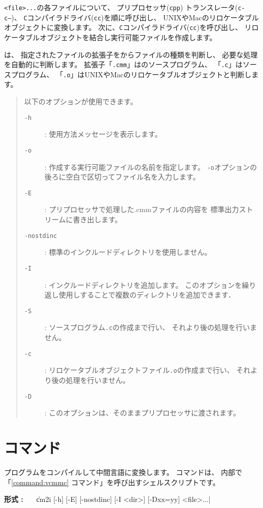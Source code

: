 {\tt <file>...}の各ファイルについて、
プリプロセッサ({\tt cpp})
トランスレータ({\tt c-c--})、
{\tt C}コンパイラドライバ({\tt cc})を順に呼び出し、
UNIXやMacのリロケータブルオブジェクトに変換します。
次に、{\tt C}コンパイラドライバ({\tt cc})を呼び出し、
リロケータブルオブジェクトを結合し実行可能ファイルを作成します。

{\cmc}は、
指定されたファイルの拡張子をからファイルの種類を判断し、
必要な処理を自動的に判断します。
拡張子「{\tt .cmm}」は{\cmml}のソースプログラム、
「{\tt .c}」は{\cl}ソースプログラム、
「{\tt .o}」はUNIXやMacのリロケータブルオブジェクトと判断します。

\begin{quote}
\hspace{-1em}以下のオプションが使用できます。

\begin{description}
\item[{\tt -h}] : 使用方法メッセージを表示します。
\item[{\tt -o}] : 作成する実行可能ファイルの名前を指定します。
{\tt -o}オプションの後ろに空白で区切ってファイル名を入力します。
\item[{\tt -E}] : プリプロセッサで処理した{.cmm}ファイルの内容を
標準出力ストリームに書き出します。
\item[{\tt -nostdinc}] : 標準のインクルードディレクトリを使用しません。
\item[{\tt -I}] : インクルードディレクトリを追加します。
このオプションを繰り返し使用しすることで複数のディレクトリを追加できます．
\item[{\tt -S}] : {\cl}ソースプログラム{\tt .c}の作成まで行い、
それより後の処理を行いません。
\item[{\tt -c}] : リロケータブルオブジェクトファイル{\tt .o}の作成まで行い、
それより後の処理を行いません。
\item[{\tt -D}] : このオプションは、そのままプリプロセッサに渡されます。
\end{description}
\end{quote}

\section{{\cmi}コマンド}

{\cmm}プログラムをコンパイルして中間言語に変換します。
{\cmi}コマンドは、
内部で「\ref{command:vcmmc} {\icmmc}コマンド」を呼び出すシェルスクリプトです。

\begin{flushleft}
{\bf 形式 : }~~~\|cm2i [-h] [-E] [-nostdinc] [-I <dir>] [-Dxx=yy] <file>...|
\end{flushleft}

